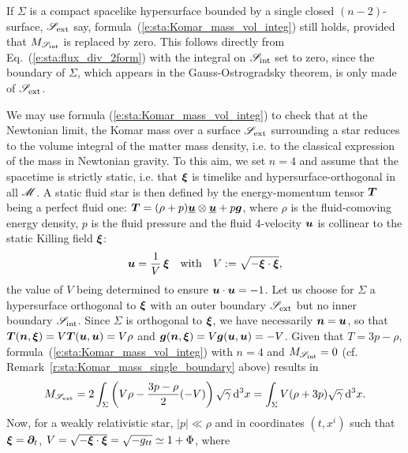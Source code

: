 \begin{remark}
\label{r:sta:Komar_mass_single_boundary}
If $\Sigma$ is a compact spacelike hypersurface bounded by a single closed
$(n-2)$-surface, $\mathscr{S}_{\rm ext}$ say, formula~(\ref{e:sta:Komar_mass_vol_integ})
still holds, provided that $M_{\mathscr{S}_{\rm int}}$ is replaced by zero. This follows
directly from Eq.~(\ref{e:sta:flux_div_2form}) with the integral on $\mathscr{S}_{\rm int}$
set to zero, since the boundary of $\Sigma$, which appears in the
Gauss-Ostrogradsky theorem, is only made of $\mathscr{S}_{\rm ext}$.
\end{remark}

\begin{example}
\label{x:sta:Komar_mass_star}
We may use formula (\ref{e:sta:Komar_mass_vol_integ})
to check that at the Newtonian limit, the Komar mass over
a surface $\mathscr{S}_{\rm ext}$ surrounding a star
reduces to the volume integral of the matter mass density,
i.e. to the classical expression of the mass
in Newtonian gravity.
To this aim, we set $n=4$ and assume that the spacetime is strictly static, i.e. that $\bm{\xi}$
is timelike and hypersurface-orthogonal in all $\mathscr{M}$.
A static fluid star is then
defined by the energy-momentum tensor $\bm{T}$ being
a perfect fluid one:
$\bm{T} = (\rho + p)\underline{\bm{u}} \otimes \underline{\bm{u}} + p \bm{g}$, where
$\rho$ is the fluid-comoving energy density,
$p$ is the fluid pressure and the fluid 4-velocity $\bm{u}$ is collinear to the
static Killing field $\bm{\xi}$:
\[
    \bm{u} = \frac{1}{V} \, \bm{\xi}
    \quad\mbox{with}\quad
    V := \sqrt{- \bm{\xi}\cdot\bm{\xi} } ,
\]
the value of $V$ being determined to ensure $\bm{u}\cdot\bm{u} = -1$.
Let us choose for $\Sigma$ a hypersurface orthogonal to $\bm{\xi}$
with an outer boundary  $\mathscr{S}_{\rm ext}$ but no inner boundary $\mathscr{S}_{\rm int}$.
Since $\Sigma$ is orthogonal to $\bm{\xi}$, we have
necessarily $\bm{n} = \bm{u}$, so that $\bm{T}(\bm{n},\bm{\xi}) = V \bm{T}(\bm{u},\bm{u})
= V \rho$ and $\bm{g}(\bm{n},\bm{\xi}) = V \bm{g}(\bm{u},\bm{u}) = -V$. Given that
$T = 3 p  - \rho$, formula~(\ref{e:sta:Komar_mass_vol_integ}) with $n=4$ and
$M_{\mathscr{S}_{\rm int}} =  0$ (cf. Remark~\ref{r:sta:Komar_mass_single_boundary} above)
results in
\[
    M_{\mathscr{S}_{\rm ext}} = 2
    \int_{\Sigma} \left( V \rho - \frac{3p - \rho}{2}(-V) \right)
    \sqrt{\gamma} \, \mathrm{d}^3 x
    = \int_{\Sigma} V (\rho + 3 p) \sqrt{\gamma} \, \mathrm{d}^3 x .
\]
Now, for a weakly relativistic star, $|p| \ll \rho$ and
 in coordinates $(t, x^i)$ such that
$\bm{\xi} = \bm{\partial}_t$,
 $V = \sqrt{- \bm{\xi}\cdot\bm{\xi} } = \sqrt{- g_{tt}} \simeq 1 + \Phi$, where

\end{example}
